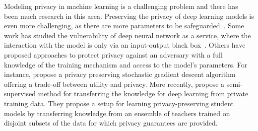 Modeling privacy in machine learning is a challenging problem and there has been much research in this area. Preserving the privacy of deep learning models is even more challenging, as there are more parameters to be safeguarded~\citep{Phan:2016}. 
Some work has studied the vulnerability of deep neural network as a service, where the interaction with the model is only via an input-output black box~\citep{Tramer:2016, Fredrikson:2015, Shokri:2016}.
Others have proposed approaches to protect privacy against an adversary with a full knowledge of the training mechanism and access to the model's parameters. For instance, \citet{Abadi:2016} propose a privacy preserving stochastic gradient descent algorithm offering a trade-off between utility and privacy. More recently, \citet{Papernot:2017} propose a semi-supervised method for transferring the knowledge for deep learning from private training data. They propose a setup for learning privacy-preserving student models by transferring knowledge from an ensemble of teachers trained on disjoint subsets of the data for which privacy guarantees are provided.